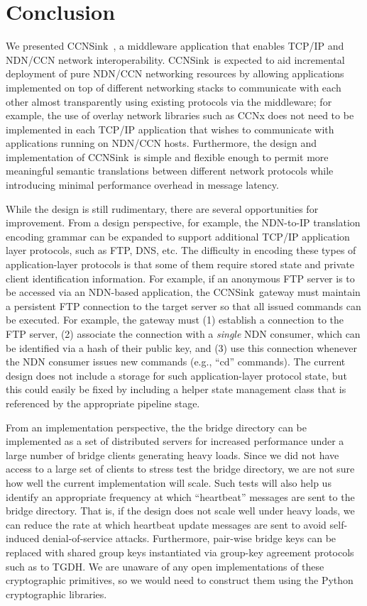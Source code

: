 \documentclass[10pt]{article}
\newcommand{\sink}{{\sf CCNSink}}
\begin{document}
\section{Conclusion}
We presented \sink\ , a middleware application that enables TCP/IP and NDN/CCN network interoperability. \sink\ is expected to aid incremental deployment of pure NDN/CCN networking resources by allowing applications implemented on top of different networking stacks to communicate with each other almost transparently using existing protocols via the middleware; for example, the use of overlay network libraries such as CCNx does not need to be implemented in each TCP/IP application that wishes to communicate with applications running on NDN/CCN hosts. Furthermore, the design and implementation of \sink\ is simple and flexible enough to permit more meaningful semantic translations between different network protocols while introducing minimal performance overhead in message latency. 

While the design is still rudimentary, there are several opportunities for improvement. From a design perspective, for example, the NDN-to-IP translation encoding grammar can be expanded to support additional TCP/IP application layer protocols, such as FTP, DNS, etc. The difficulty in encoding these types of application-layer protocols is that some of them require stored state and private client identification information. For example, if an anonymous FTP server is to be accessed via an NDN-based application, the \sink\ gateway must maintain a persistent FTP connection to the target server so that all issued commands can be executed. For example, the gateway must (1) establish a connection to the FTP server, (2) associate the connection with a \emph{single} NDN consumer, which can be identified via a hash of their public key, and (3) use this connection whenever the NDN consumer issues new commands (e.g., ``cd'' commands). The current design does not include a storage for such application-layer protocol state, but this could easily be fixed by including a helper state management class that is referenced by the appropriate pipeline stage. 

From an implementation perspective, the the bridge directory can be implemented as a set of distributed servers for increased performance under a large number of bridge clients generating heavy loads. Since we did not have access to a large set of clients to stress test the bridge directory, we are not sure how well the current implementation will scale. Such tests will also help us identify an appropriate frequency at which ``heartbeat'' messages are sent to the bridge directory. That is, if the design does not scale well under heavy loads, we can reduce the rate at which heartbeat update messages are sent to avoid self-induced denial-of-service attacks. Furthermore, pair-wise bridge keys can be replaced with shared group keys instantiated via group-key agreement protocols such as to TGDH. We are unaware of any open implementations of these cryptographic primitives, so we would need to construct them using the Python cryptographic libraries. 



\end{document}
